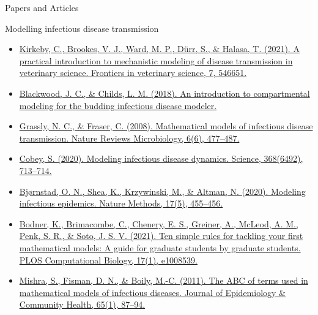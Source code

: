\documentclass[
  ignorenonframetext,
]{beamer}
\providecommand{\tightlist}{%
  \setlength{\itemsep}{0pt}\setlength{\parskip}{0pt}}\usepackage{longtable,booktabs,array}
\begin{document}
\begin{frame}
\begin{block}{Papers and Articles}
\label{papers-and-articles}
\begin{block}{Modelling infectious disease transmission}
\label{modelling-infectious-disease-transmission}
\begin{itemize}
\tightlist
\item
  \href{https://www.frontiersin.org/articles/10.3389/fvets.2020.546651/full}{Kirkeby,
  C., Brookes, V. J., Ward, M. P., Dürr, S., \& Halasa, T. (2021). A
  practical introduction to mechanistic modeling of disease transmission
  in veterinary science. Frontiers in veterinary science, 7, 546651.}
\item
  \href{https://vtechworks.lib.vt.edu/items/61e9ca00-ef21-4356-bcd7-a9294a1d2f17}{Blackwood,
  J. C., \& Childs, L. M. (2018). An introduction to compartmental
  modeling for the budding infectious disease modeler.}
\item
  \href{https://doi.org/10.1038/nrmicro1845}{Grassly, N. C., \& Fraser,
  C. (2008). Mathematical models of infectious disease transmission.
  Nature Reviews Microbiology, 6(6), 477--487.}
\end{itemize}
\end{block}
\end{block}
\end{frame}

\begin{frame}
\begin{itemize}
\tightlist
\item
  \href{https://doi.org/10.1126/science.abb5659}{Cobey, S. (2020).
  Modeling infectious disease dynamics. Science, 368(6492), 713--714.}
\item
  \href{https://doi.org/10.1038/s41592-020-0822-z}{Bjørnstad, O. N.,
  Shea, K., Krzywinski, M., \& Altman, N. (2020). Modeling infectious
  epidemics. Nature Methods, 17(5), 455--456.}
\item
  \href{https://doi.org/10.1371/journal.pcbi.1008539}{Bodner, K.,
  Brimacombe, C., Chenery, E. S., Greiner, A., McLeod, A. M., Penk, S.
  R., \& Soto, J. S. V. (2021). Ten simple rules for tackling your first
  mathematical models: A guide for graduate students by graduate
  students. PLOS Computational Biology, 17(1), e1008539.}
\item
  \href{https://jech.bmj.com/content/65/1/87}{Mishra, S., Fisman, D. N.,
  \& Boily, M.-C. (2011). The ABC of terms used in mathematical models
  of infectious diseases. Journal of Epidemiology \& Community Health,
  65(1), 87--94.}
\end{itemize}
\end{frame}
\end{document}
